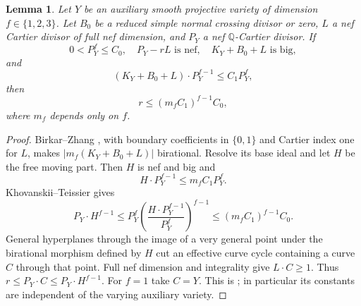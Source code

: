 \documentclass[12pt,a4paper,psamsfonts]{amsart}
\theoremstyle{definition}
\theoremstyle{plain}
\newtheorem{lemma}{Lemma}[section]
\begin{document}
\begin{lemma}\label{lem:bounded-curves}
Let $Y$ be an auxiliary smooth projective variety of dimension
$f\in\{1,2,3\}$. Let $B_0$ be a reduced simple normal crossing
divisor or zero, $L$ a nef Cartier divisor of full nef dimension,
and $P_Y$ a nef $\mathbb{Q}$-Cartier divisor. If
\[
 0<P_Y^f\le C_0,\quad P_Y-rL\text{ is nef},\quad
 K_Y+B_0+L\text{ is big},
\]
and
\[
 (K_Y+B_0+L)\cdot P_Y^{f-1}\le C_1P_Y^f,
\]
then
\[
 r\le(m_fC_1)^{f-1}C_0,
\]
where $m_f$ depends only on $f$.
\end{lemma}
\begin{proof}
Birkar--Zhang \cite[Theorem~1.3]{BZ}, with boundary coefficients
in $\{0,1\}$ and Cartier index one for $L$, makes
$|m_f(K_Y+B_0+L)|$ birational. Resolve its base ideal and let
$H$ be the free moving part. Then $H$ is nef and big and
\[
 H\cdot P_Y^{f-1}\le m_fC_1P_Y^f.
\]
Khovanskii--Teissier gives
\[
 P_Y\cdot H^{f-1}\le P_Y^f
 \left(\frac{H\cdot P_Y^{f-1}}{P_Y^f}\right)^{f-1}
 \le(m_fC_1)^{f-1}C_0.
\]
General hyperplanes through the image of a very general point
under the birational morphism defined by $H$ cut an effective
curve cycle containing a curve $C$ through that point.
Full nef dimension and integrality give $L\cdot C\ge1$.
Thus $r\le P_Y\cdot C\le P_Y\cdot H^{f-1}$. For $f=1$ take $C=Y$.
This is \cite[Lemma~4.1]{NS}; in particular its constants are
independent of the varying auxiliary variety.
\end{proof}
\end{document}
